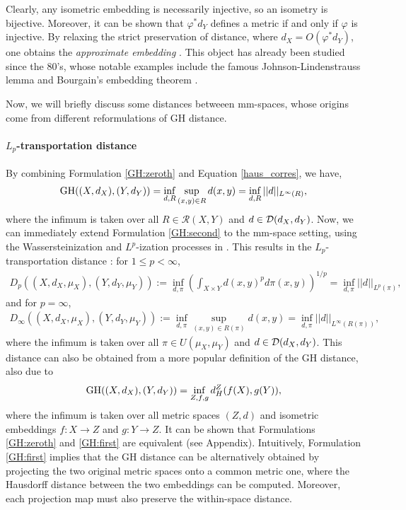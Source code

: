 Clearly, any isometric embedding is necessarily injective, so an isometry is bijective.
Moreover, it can be shown that $\varphi^* d_Y$ defines a metric if and
only if $\varphi$ is injective. By relaxing the strict preservation of distance,
where $d_X = O(\varphi^* d_Y)$, one obtains the \textit{approximate embedding} \citep{Matousek13}.
This object has already been studied since the 80's, whose notable examples include the famous
Johnson-Lindenstrauss lemma \citep{Johnson84} and Bourgain's embedding theorem \citep{Bourgain85}.

Now, we will briefly discuss some distances betweeen mm-spaces, whose origins come from
different reformulations of GH distance.
\paragraph{$L_p$-transportation distance}
By combining Formulation \eqref{GH:zeroth} and Equation \eqref{haus_corres}, we have,
\begin{align}
  \label{GH:second}
    \text{GH}((X,d_X), (Y,d_Y)) = \inf_{d, R} \sup_{(x,y) \in R} d(x,y) =
    \inf_{d,R} || d ||_{L^{\infty}(R)},
\end{align}
where the infimum is taken over all $R \in \mathcal R(X,Y)$ and $d \in \mathcal D(d_X, d_Y)$.
Now, we can immediately extend Formulation \eqref{GH:second} to the mm-space setting,
using the Wassersteinization and $L^p$-ization processes in .
This results in the $L_p$-transportation distance \citep{Sturm06}: for $1 \leq p < \infty$,
\begin{align}
    D_p((X, d_X, \mu_X), (Y, d_Y, \mu_Y))
    := \inf_{d, \pi} \left( \int_{X \times Y} d(x,y)^p d\pi(x,y) \right)^{1/p}
    = \inf_{d, \pi} || d ||_{L^p(\pi)},
\end{align}
and for $p = \infty$,
\begin{align}
    D_{\infty}((X, d_X, \mu_X), (Y, d_Y, \mu_Y)) := \inf_{d, \pi} \sup_{(x,y) \in R(\pi)} d(x,y) =
    \inf_{ d, \pi} || d ||_{L^{\infty}(R(\pi))},
\end{align}
where the infimum is taken over all $\pi \in U(\mu_X, \mu_Y)$ and $d \in \mathcal D(d_X, d_Y)$.
This distance can also be obtained from a more popular definition of the GH distance,
also due to \citep{Gromov99}
\begin{align}
   \label{GH:first}
  \text{GH}((X,d_X), (Y,d_Y)) = \inf_{Z, f, g} d_{ H}^{Z}(f(X), g(Y)),
\end{align}
where the infimum is taken over all metric spaces $(Z,d)$ and isometric embeddings
$f: X \to Z$ and $g: Y \to Z$. It can be shown that Formulations \eqref{GH:zeroth} and \eqref{GH:first}
are equivalent (see Appendix). Intuitively, Formulation \eqref{GH:first} implies that
the GH distance can be alternatively obtained by projecting the two original metric spaces
onto a common metric one, where the Hausdorff distance between the two embeddings can be computed.
Moreover, each projection map must also preserve the within-space distance.


